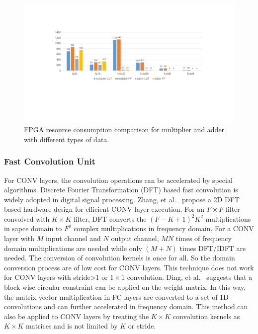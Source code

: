 \begin{figure}[t]
    \centering
    \includegraphics[width=1.0\columnwidth]{fig/mac_util.pdf}
    \caption{FPGA resource consumption comparison for multiplier and adder with different types of data.}
    \label{fig:mac_util}
\end{figure}

\subsubsection{Fast Convolution Unit}
For CONV layers, the convolution operations can be accelerated by special algorithms. Discrete Fourier Transformation (DFT) based fast convolution is widely adopted in digital signal processing. Zhang, et al.~\cite{zhang2017frequency} propose a 2D DFT based hardware design for efficient CONV layer execution. For an $F\times F$ filter convolved with $K\times K$ filter, DFT converts the $(F-K+1)^2K^2$ multiplications in sapce domain to $F^2$ complex multiplications in frequency domain. For a CONV layer with $M$ input channel and $N$ output channel, $MN$ times of frequency domain multiplications are needed while only $(M+N)$ times DFT/IDFT are needed. The conversion of convolution kernels is once for all. So the domain conversion process are of low cost for CONV layers. This technique does not work for CONV layers with stride>1 or $1\times 1$ convolution. Ding, et al.~\cite{ding2017c} suggests that a block-wise circular constraint can be applied on the weight matrix. In this way, the matrix vector multiplication in FC layers are converted to a set of 1D convolutions and can further accelerated in frequency domain. This method can also be applied to CONV layers by treating the $K\times K$ convolution kernels as $K\times K$ matrices and is not limited by $K$ or stride.

